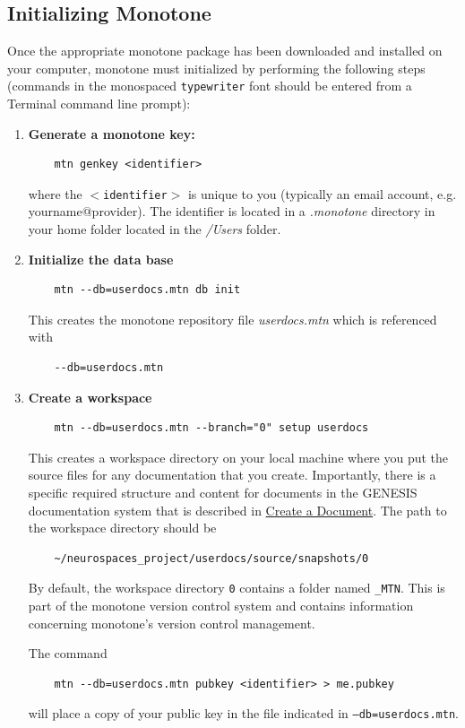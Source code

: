 \documentclass[12pt]{article}
\begin{document}
\subsection*{Initializing Monotone}

Once the appropriate monotone package has been downloaded and installed on your computer, monotone must  initialized by performing the following steps (commands in the monospaced {\tt typewriter} font should be entered from a Terminal command line prompt):

\begin{enumerate}

\item {\bf Generate a monotone key:} 
\begin{verbatim}
    mtn genkey <identifier>
\end{verbatim}
where the {\tt $<$identifier$>$} is unique to you (typically an email account, e.g. yourname@provider). The identifier is located in a {\it .monotone} directory in your home folder located in the {\it /Users} folder.

\item {\bf Initialize the data base}
\begin{verbatim}
    mtn --db=userdocs.mtn db init
\end{verbatim}
This creates the monotone repository file {\it userdocs.mtn} which is referenced with
\begin{verbatim}
    --db=userdocs.mtn
\end{verbatim}

\item {\bf Create a workspace}
\begin{verbatim}
    mtn --db=userdocs.mtn --branch="0" setup userdocs
\end{verbatim}
This creates a workspace directory on your local machine where you put the source files for any documentation that you create. Importantly, there is a specific required structure and content for documents in the GENESIS documentation system that is described in \href{../create-document/create-document.pdf}{Create a Document}. The path to the workspace directory should be
\begin{verbatim}
    ~/neurospaces_project/userdocs/source/snapshots/0
\end{verbatim}
By default, the workspace directory {\tt 0} contains a folder named {\tt \_MTN}. This is part of the monotone version control system and contains information concerning monotone's version control management.

The command
\begin{verbatim}
    mtn --db=userdocs.mtn pubkey <identifier> > me.pubkey
\end{verbatim}
will place a copy of your public key in the file indicated in {\tt --db=userdocs.mtn}.
\end{enumerate}
\end{document}
